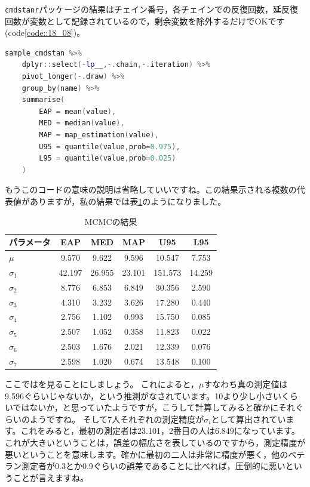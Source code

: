 \documentclass{ltjsbook}
\begin{document}
\texttt{cmdstanr}パッケージの結果はチェイン番号，各チェインでの反復回数，延反復回数が変数として記録されているので，剰余変数を除外するだけでOKです(code\ref{code::18_08})。

\begin{lstlisting}[language=C++,label={code::18_08},caption={cmdstanrパッケージによる結果の要約}]
sample_cmdstan %>% 
    dplyr::select(-lp__,-.chain,-.iteration) %>% 
    pivot_longer(-.draw) %>% 
    group_by(name) %>% 
    summarise(
        EAP = mean(value),
        MED = median(value),
        MAP = map_estimation(value),
        U95 = quantile(value,prob=0.975),
        L95 = quantile(value,prob=0.025)
    )
\end{lstlisting}

もうこのコードの意味の説明は省略していいですね。この結果示される複数の代表値がありますが，私の結果では表\ref{tbl::18_01}のようになりました。


\begin{table}[ht]
    \caption{MCMCの結果}
    \centering
    \begin{tabular}{l|ccccc}
        \hline
        パラメータ & EAP & MED & MAP & U95 & L95\\
        \hline
        $\mu$ & 9.570 & 9.622 & 9.596 & 10.547 & 7.753\\
        $\sigma_1$ & 42.197 & 26.955 & 23.101 & 151.573 & 14.259\\
        $\sigma_2$ & 8.776 & 6.853 & 6.849 & 30.356 & 2.590\\
        $\sigma_3$ & 4.310 & 3.232 & 3.626 & 17.280 & 0.440\\
        $\sigma_4$ & 2.756 & 1.102 & 0.993 & 15.750 & 0.085\\
        $\sigma_5$ & 2.507 & 1.052 & 0.358 & 11.823 & 0.022\\
        $\sigma_6$ & 2.503 & 1.676 & 2.021 & 12.339 & 0.076\\
        $\sigma_7$ & 2.598 & 1.020 & 0.674 & 13.548 & 0.100\\\hline
        \end{tabular}
        \label{tbl::18_01}
\end{table}

ここではを見ることにしましょう。
これによると，$\mu$すなわち真の測定値は9.596ぐらいじゃないか，という推測がなされています。10より少し小さいくらいではないか，と思っていたようですが，こうして計算してみると確かにそれぐらいのようですね。
そして7人それぞれの測定精度が$\sigma_i$として算出されています。これをみると，最初の測定者は23.101，2番目の人は6.849になっています。これが大きいということは，誤差の幅広さを表しているのですから，測定精度が悪いということを意味します。確かに最初の二人は非常に精度が悪く，他のベテラン測定者が0.3とか0.9ぐらいの誤差であることに比べれば，圧倒的に悪いということが言えますね。
\end{document}
